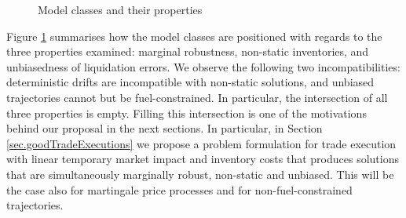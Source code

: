 \documentclass[10pt,a4paper]{article}
\begin{document}
\begin{center}
\begin{figure}
\centering
{}
\caption{Model classes and their properties}
\label{fig.VennDiagramModelClasses}
\end{figure}
\end{center}


Figure \ref{fig.VennDiagramModelClasses} summarises how the model classes are positioned with regards to the three properties examined: marginal robustness, non-static inventories, and unbiasedness of liquidation errors. We observe the following two incompatibilities: deterministic drifts are incompatible with non-static solutions, and unbiased trajectories cannot but be fuel-constrained. In particular, the intersection of all three properties is empty. Filling this intersection is one of the motivations behind our proposal in the next sections. In particular, in Section \ref{sec.goodTradeExecutions} we propose a problem formulation for trade execution with linear temporary market impact and inventory costs that produces solutions that are simultaneously marginally robust, non-static and unbiased.  This will be the case also for martingale price processes and for non-fuel-constrained trajectories. 
\end{document}
